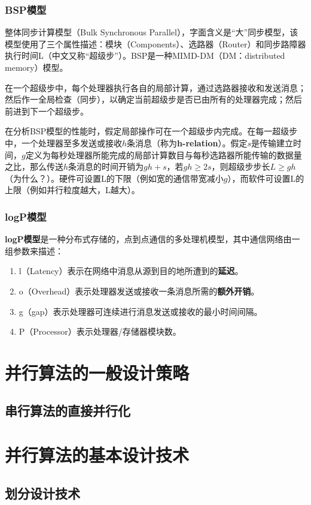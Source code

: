 \documentclass{article}
\begin{document}
			\subsubsection{BSP模型}
				整体同步计算模型（Bulk Synchronous Parallel），字面含义是``大''同步模型，该模型使用了三个属性描述：模块（Components）、选路器（Router）和同步路障器执行时间L（中文又称“超级步”）。BSP是一种MIMD-DM（DM：distributed memory）模型。
				
				在一个超级步中，每个处理器执行各自的局部计算，通过选路器接收和发送消息；然后作一全局检查（同步），以确定当前超级步是否已由所有的处理器完成；然后前进到下一个超级步。
				
				在分析BSP模型的性能时，假定局部操作可在一个超级步内完成。在每一超级步中，一个处理器至多发送或接收$h$条消息（称为\textbf{h-relation}）。假定$s$是传输建立时间，$g$定义为每秒处理器所能完成的局部计算数目与每秒选路器所能传输的数据量之比，那么传送$h$条消息的时间开销为$gh+s$，若$gh\geq 2s$，则超级步步长$L\geq gh$（为什么？）。硬件可设置L的下限（例如宽的通信带宽减小$g$），而软件可设置L的上限（例如并行粒度越大，L越大）。
			\subsubsection{logP模型}
				\textbf{logP模型}是一种分布式存储的，点到点通信的多处理机模型，其中通信网络由一组参数来描述：
				\begin{enumerate}
					\item l（Latency）表示在网络中消息从源到目的地所遭到的\textbf{延迟}。
					\item o（Overhead）表示处理器发送或接收一条消息所需的\textbf{额外开销}。
					\item g（gap）表示处理器可连续进行消息发送或接收的最小时间间隔。
					\item P（Processor）表示处理器/存储器模块数。
				\end{enumerate}
		\section{并行算法的一般设计策略}
			\subsection{串行算法的直接并行化}
			
		\section{并行算法的基本设计技术}
			\subsection{划分设计技术}
\end{document}
